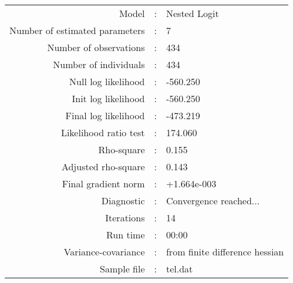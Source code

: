 

\begin{flushleft}
\begin{tabular}{rcl}
\hline
Model &:& Nested Logit\\
Number of estimated parameters&:&7\\
Number of  observations &:& 434\\
Number of individuals&:&434\\
Null log likelihood&:&-560.250\\
Init log likelihood&:&-560.250\\
Final log likelihood&:&-473.219\\
Likelihood ratio test &:&174.060\\
Rho-square&:&0.155\\
Adjusted rho-square&:&0.143\\
Final gradient norm&:&+1.664e-003\\
Diagnostic&:&Convergence reached...\\
Iterations&:&14\\
Run time&:&00:00\\
Variance-covariance&:&from finite difference hessian\\
Sample file&:&tel.dat\\
\end{tabular}
\end{flushleft}
